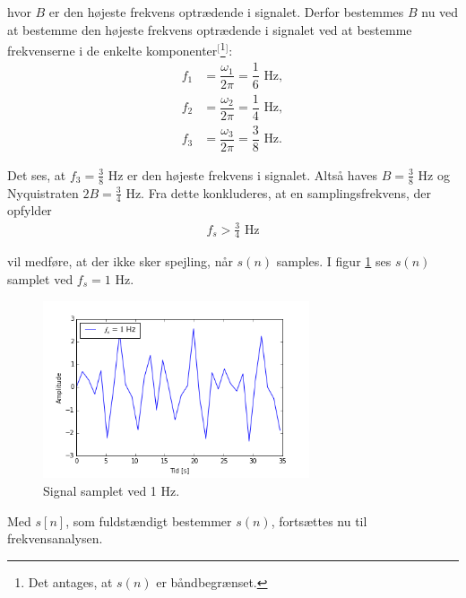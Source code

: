 hvor $B$ er den højeste frekvens optrædende i signalet. Derfor bestemmes $B$ nu ved at bestemme den højeste frekvens optrædende i signalet ved at bestemme frekvenserne i de enkelte komponenter$^[$\footnote{Det antages, at $s(n)$ er båndbegrænset.}$^]$:
\begin{align*}
f_1 &= \dfrac{\omega_1}{2\pi} = \dfrac{1}{6}\text{ Hz}, \\
f_2 &= \dfrac{\omega_2}{2\pi} = \dfrac{1}{4}\text{ Hz}, \\
f_3 &= \dfrac{\omega_3}{2\pi} = \dfrac{3}{8}\text{ Hz}.
\end{align*}

Det ses, at $f_3 = \frac{3}{8}$ Hz er den højeste frekvens i signalet. Altså haves $B=\frac{3}{8}$ Hz og Nyquistraten $2B=\frac{3}{4}$ Hz. Fra dette konkluderes, at en samplingsfrekvens, der opfylder
\begin{align}
f_s>\frac{3}{4}\text{ Hz}
\end{align}

vil medføre, at der ikke sker spejling, når $s(n)$ samples. I figur \ref{fig:s_sampled} ses $s(n)$ samplet ved $f_s=1$ Hz.
\begin{figure}[H]
\centering
\includegraphics[width=0.7\textwidth]{figures/signal_1hz}
\caption{Signal samplet ved 1 Hz.}
\label{fig:s_sampled}
\end{figure}

Med $s[n]$, som fuldstændigt bestemmer $s(n)$, fortsættes nu til frekvensanalysen.